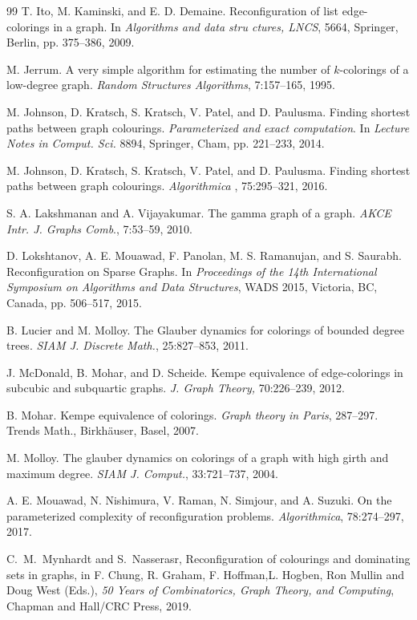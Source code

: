 \documentclass[12pt]{article}%
\begin{document}
\begin{thebibliography}{99}
T. Ito, M. Kaminski, and E. D. Demaine. Reconfiguration of
list edge-colorings in a graph. In \emph{Algorithms and data str\emph{u}%
ctures, LNCS}, 5664, Springer, Berlin, pp. 375--386, 2009.

M. Jerrum. A very simple algorithm for estimating the
number of $k$-colorings of a low-degree graph. \emph{Random Structures
Algorithms}, 7:157--165, 1995.

M. Johnson, D. Kratsch, S. Kratsch, V. Patel, and D.
Paulusma. Finding shortest paths between graph colourings. \emph{Parameterized
and exact computation}. In \emph{Lecture Notes in Comput. Sci.} 8894,
Springer, Cham, pp. 221--233, 2014.

M. Johnson, D. Kratsch, S. Kratsch, V. Patel, and D.
Paulusma. Finding shortest paths between graph colourings. \emph{Algorithmica}%
, 75:295--321, 2016.

S. A. Lakshmanan and A. Vijayakumar. The gamma graph of a
graph. \emph{AKCE Intr. J. Graphs Comb}., 7:53--59,\textbf{ }2010.

D. Lokshtanov, A. E. Mouawad, F. Panolan, M. S.
Ramanujan, and S. Saurabh. Reconfiguration on Sparse Graphs. In
\emph{Proceedings of the 14th International Symposium on Algorithms and Data
Structures}, WADS 2015, Victoria, BC, Canada, pp. 506--517, 2015.

B. Lucier and M. Molloy. The Glauber dynamics for colorings
of bounded degree trees. \emph{SIAM J. Discrete Math.}, 25:827--853, 2011.

J. McDonald, B. Mohar, and D. Scheide. Kempe equivalence of
edge-colorings in subcubic and subquartic graphs. \emph{J. Graph Theory,
}70:226--239, 2012.

B. Mohar. Kempe equivalence of colorings. \emph{Graph
theory in Paris}, 287--297. Trends Math., Birkh\"{a}user, Basel, 2007.

M. Molloy. The glauber dynamics on colorings of a graph
with high girth and maximum degree. \emph{SIAM J. Comput.},\emph{
}33:721--737, 2004.

A. E. Mouawad, N. Nishimura, V. Raman, N. Simjour, and A.
Suzuki. On the parameterized complexity of reconfiguration problems.
\emph{Algorithmica}, 78:274--297, 2017.

C.~M.~Mynhardt and S.~Nasserasr, Reconfiguration of
colourings and dominating sets in graphs, in F. Chung, R. Graham, F.
Hoffman,L. Hogben, Ron Mullin and Doug West (Eds.), \emph{50 Years of
Combinatorics, Graph Theory, and Computing}, Chapman and Hall/CRC Press, 2019.


\end{thebibliography}
\end{document}
